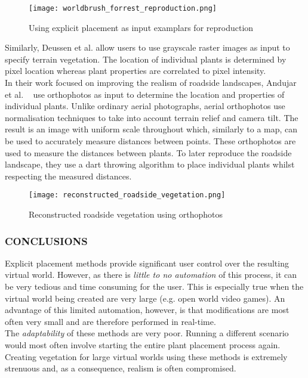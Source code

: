 \begin{figure}[h]
  \centering
	\texttt{[image: worldbrush\_forrest\_reproduction.png]}
	\caption{Using explicit placement as input examplars for reproduction \cite{Emilien}}
	\label{Explicit placement as input examplars}
\end{figure}

Similarly, Deussen et al. \cite{Deussen1998} allow users to use grayscale raster images as input to specify terrain vegetation. The location of individual plants is determined by pixel location whereas plant properties are correlated to pixel intensity.\\

In their work focused on improving the realism of roadside landscapes, Andujar et al. ~\cite{Andujar2014} use orthophotos as input to determine the location and properties of individual plants. Unlike ordinary aerial photographs, aerial orthophotos use normalisation techniques to take into account terrain relief and camera tilt. The result is an image with uniform scale throughout which, similarly to a map, can be used to accurately measure distances between points. These orthophotos are used to measure the distances between plants. To later reproduce the roadside landscape, they use a dart throwing algorithm to place individual plants whilst respecting the measured distances. \\

\begin{figure}[!htb]
  \centering
	\label{Reconstructed roadside vegetation using orthophotos}
	\texttt{[image: reconstructed\_roadside\_vegetation.png]}
	\caption{Reconstructed roadside vegetation using orthophotos ~\cite{Andujar2014}}
\end{figure}

\subsubsection{CONCLUSIONS}

Explicit placement methods provide significant user control over the resulting virtual world. However, as there is \textit{little to no automation} of this process, it can be very tedious and time consuming for the user. This is especially true when the virtual world being created are very large (e.g. open world video games). An advantage of this limited automation, however, is that modifications are most often very small and are therefore performed in real-time. \\
The \textit{adaptability} of these methods are very poor. Running a different scenario would most often involve starting the entire plant placement process again. \\
Creating vegetation for large virtual worlds using these methods is extremely strenuous and, as a consequence, realism is often compromised.


